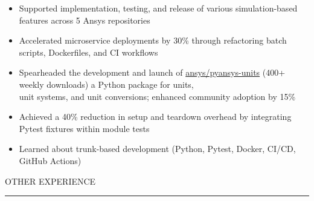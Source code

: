 \documentclass[9pt]{extarticle}
\begin{document}
\begin{adjustwidth}{10pt}{10pt}
	\begin{itemize}[topsep=0pt, labelsep=10pt, leftmargin=24pt, label=\textcolor{imptextblack}{\textbullet}]
		\item Supported implementation, testing, and release of various simulation-based features across \textcolor{imptextblack}{5} Ansys repositories
		\item Accelerated microservice deployments by \textcolor{imptextblack}{30\%} through refactoring batch scripts, Dockerfiles, and CI workflows
		\item Spearheaded the development and launch of \href{https://github.com/ansys/pyansys-units}{ansys/pyansys-units} ({\small \textcolor{imptextblack}{400+} weekly downloads}) a Python package for units, \\
			unit systems, and unit conversions; enhanced community adoption by \textcolor{imptextblack}{15\%}
		\item Achieved a \textcolor{imptextblack}{40\%} reduction in setup and teardown overhead by integrating Pytest fixtures within module tests
		\item Learned about \textcolor{imptextblack}{trunk-based} development ({\small Python, Pytest, Docker, CI/CD, GitHub Actions})
	\end{itemize}
\end{adjustwidth}

\vspace{5pt}

\begin{adjustwidth}{4pt}{4pt} \large \textrm{OTHER EXPERIENCE} \end{adjustwidth}
\rule[8pt]{\linewidth}{0.4pt}
\end{document}
